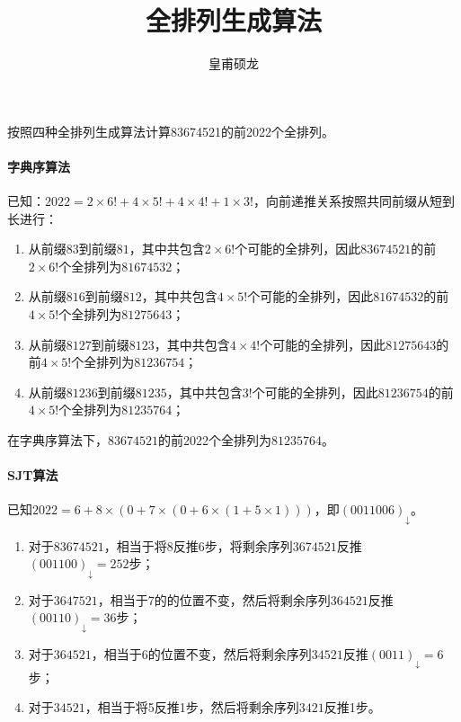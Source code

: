 \documentclass[UTF8]{ctexart}
\title{全排列生成算法}
\author{皇甫硕龙}
\begin{document}
    \maketitle

    按照四种全排列生成算法计算83674521的前2022个全排列。

    \paragraph*{字典序算法}

    已知：$2022 = 2\times 6! + 4\times 5! + 4\times 4! + 1\times 3!$，向前递推关系按照共同前缀从短到长进行：

    \begin{enumerate}[label=\textit{第\arabic*步}, itemsep=0.2em]
        \item 从前缀$83$到前缀$81$，其中共包含$2\times 6!$个可能的全排列，因此$83674521$的前$2\times 6!$个全排列为$81674532$；
        \item 从前缀$816$到前缀$812$，其中共包含$4\times 5!$个可能的全排列，因此$81674532$的前$4\times 5!$个全排列为$81275643$；
        \item 从前缀$8127$到前缀$8123$，其中共包含$4\times 4!$个可能的全排列，因此$81275643$的前$4\times 5!$个全排列为$81236754$；
        \item 从前缀$81236$到前缀$81235$，其中共包含$3!$个可能的全排列，因此$81236754$的前$4\times 5!$个全排列为$81235764$；
    \end{enumerate}

    在字典序算法下，$83674521$的前2022个全排列为$81235764$。

    \paragraph*{SJT算法}

    已知$2022 = 6 + 8\times(0 + 7\times (0 + 6\times (1 + 5\times 1)))$，即$(0011006)_\downarrow$。

    \begin{enumerate}[label=\textit{第\arabic*步}, itemsep=0.2em]
        \item 对于$83674521$，相当于将8反推6步，将剩余序列$3674521$反推$(001100)_\downarrow = 252$步；
        \item 对于$3647521$，相当于7的的位置不变，然后将剩余序列$364521$反推$(00110)_\downarrow = 36$步；
        \item 对于$364521$，相当于6的位置不变，然后将剩余序列$34521$反推$(0011)_\downarrow = 6$步；
        \item 对于$34521$，相当于将5反推1步，然后将剩余序列$3421$反推1步。
    \end{enumerate}
\end{document}
